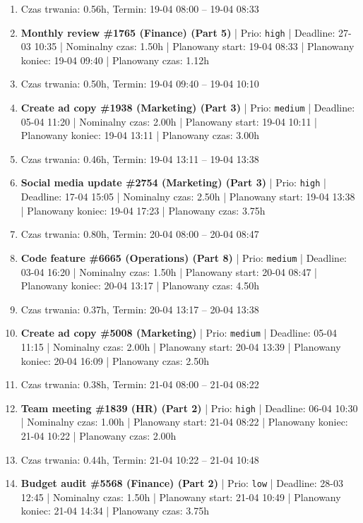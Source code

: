 {\begin{enumerate}
  \item [\textbf{PRZERWA}] Czas trwania: 0.56h, Termin: 19-04 08:00 -- 19-04 08:33
  \item [\textbf{14627}] \textbf{Monthly review \#1765 (Finance) (Part 5)} | Prio: \texttt{high} | Deadline: 27-03 10:35 | Nominalny czas: 1.50h | Planowany start: 19-04 08:33 | Planowany koniec: 19-04 09:40 | Planowany czas: 1.12h
  \item [\textbf{PRZERWA}] Czas trwania: 0.50h, Termin: 19-04 09:40 -- 19-04 10:10
  \item [\textbf{14652}] \textbf{Create ad copy \#1938 (Marketing) (Part 3)} | Prio: \texttt{medium} | Deadline: 05-04 11:20 | Nominalny czas: 2.00h | Planowany start: 19-04 10:11 | Planowany koniec: 19-04 13:11 | Planowany czas: 3.00h
  \item [\textbf{PRZERWA}] Czas trwania: 0.46h, Termin: 19-04 13:11 -- 19-04 13:38
  \item [\textbf{14611}] \textbf{Social media update \#2754 (Marketing) (Part 3)} | Prio: \texttt{high} | Deadline: 17-04 15:05 | Nominalny czas: 2.50h | Planowany start: 19-04 13:38 | Planowany koniec: 19-04 17:23 | Planowany czas: 3.75h
  \item [\textbf{PRZERWA}] Czas trwania: 0.80h, Termin: 20-04 08:00 -- 20-04 08:47
  \item [\textbf{14667}] \textbf{Code feature \#6665 (Operations) (Part 8)} | Prio: \texttt{medium} | Deadline: 03-04 16:20 | Nominalny czas: 1.50h | Planowany start: 20-04 08:47 | Planowany koniec: 20-04 13:17 | Planowany czas: 4.50h
  \item [\textbf{PRZERWA}] Czas trwania: 0.37h, Termin: 20-04 13:17 -- 20-04 13:38
  \item [\textbf{14666}] \textbf{Create ad copy \#5008 (Marketing)} | Prio: \texttt{medium} | Deadline: 05-04 11:15 | Nominalny czas: 2.00h | Planowany start: 20-04 13:39 | Planowany koniec: 20-04 16:09 | Planowany czas: 2.50h
  \item [\textbf{PRZERWA}] Czas trwania: 0.38h, Termin: 21-04 08:00 -- 21-04 08:22
  \item [\textbf{14610}] \textbf{Team meeting \#1839 (HR) (Part 2)} | Prio: \texttt{high} | Deadline: 06-04 10:30 | Nominalny czas: 1.00h | Planowany start: 21-04 08:22 | Planowany koniec: 21-04 10:22 | Planowany czas: 2.00h
  \item [\textbf{PRZERWA}] Czas trwania: 0.44h, Termin: 21-04 10:22 -- 21-04 10:48
  \item [\textbf{14693}] \textbf{Budget audit \#5568 (Finance) (Part 2)} | Prio: \texttt{low} | Deadline: 28-03 12:45 | Nominalny czas: 1.50h | Planowany start: 21-04 10:49 | Planowany koniec: 21-04 14:34 | Planowany czas: 3.75h

\end{enumerate}}
